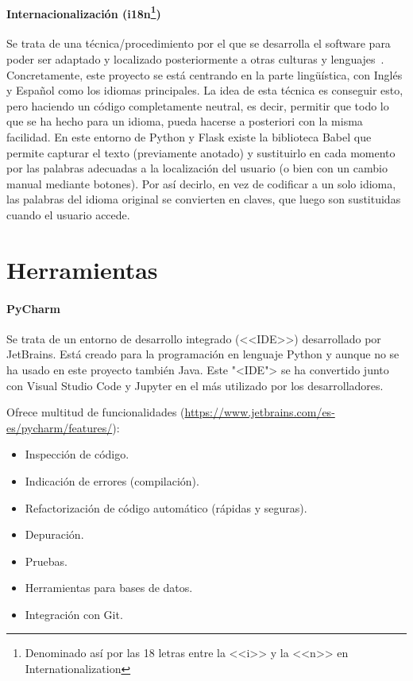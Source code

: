 \paragraph{Internacionalización (i18n\protect\footnote{Denominado así por las 18
letras entre la <<i>> y la <<n>> en Internationalization})} Se trata de una
técnica/procedimiento por el que se desarrolla el software para poder ser
adaptado y localizado posteriormente a otras culturas y
lenguajes~\cite{lokalise}. Concretamente, este proyecto se está centrando en la
parte lingüística, con Inglés y Español como los idiomas principales. La idea de
esta técnica es conseguir esto, pero haciendo un código completamente neutral,
es decir, permitir que todo lo que se ha hecho para un idioma, pueda hacerse a
posteriori con la misma facilidad. En este entorno de Python y Flask existe la
biblioteca Babel que permite capturar el texto (previamente anotado) y
sustituirlo en cada momento por las palabras adecuadas a la localización del
usuario (o bien con un cambio manual mediante botones). Por así decirlo, en vez
de codificar a un solo idioma, las palabras del idioma original se convierten en
claves, que luego son sustituidas cuando el usuario accede.


\section{Herramientas}

\paragraph{PyCharm}
Se trata de un entorno de desarrollo integrado (<<IDE>>) desarrollado por
JetBrains. Está creado para la programación en lenguaje Python y aunque no se ha
usado en este proyecto también Java. Este "<IDE"> se ha convertido junto con
Visual Studio Code y Jupyter en el más utilizado por los desarrolladores.

Ofrece multitud de funcionalidades
(\url{https://www.jetbrains.com/es-es/pycharm/features/}):
\begin{itemize}
	\item Inspección de código.
	\item Indicación de errores (compilación).
	\item Refactorización de código automático (rápidas y seguras).
	\item Depuración.
	\item Pruebas.
	\item Herramientas para bases de datos.
	\item Integración con Git.
\end{itemize}

